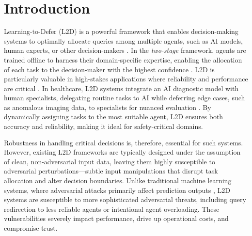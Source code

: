 
\section{Introduction}

Learning-to-Defer (L2D) is a powerful framework that enables decision-making systems to optimally allocate queries among multiple agents, such as AI models, human experts, or other decision-makers \citep{madras2018predict}. In the \emph{two-stage} framework, agents are trained offline to harness their domain-specific expertise, enabling the allocation of each task to the decision-maker with the highest confidence \citep{mao2023twostage, mao2024regressionmultiexpertdeferral, montreuil2024twostagelearningtodefermultitasklearning}. L2D is particularly valuable in high-stakes applications where reliability and performance are critical \citep{mozannar2021consistent, Verma2022LearningTD}. In healthcare, L2D systems integrate an AI diagnostic model with human specialists, delegating routine tasks to AI while deferring edge cases, such as anomalous imaging data, to specialists for nuanced evaluation \citep{Mozannar2023WhoSP}. By dynamically assigning tasks to the most suitable agent, L2D ensures both accuracy and reliability, making it ideal for safety-critical domains.


Robustness in handling critical decisions is, therefore, essential for such systems. However, existing L2D frameworks are typically designed under the assumption of clean, non-adversarial input data, leaving them highly susceptible to adversarial perturbations—subtle input manipulations that disrupt task allocation and alter decision boundaries. Unlike traditional machine learning systems, where adversarial attacks primarily affect prediction outputs \citep{goodfellow2014explaining, szegedy2014intriguingpropertiesneuralnetworks, Grounded}, L2D systems are susceptible to more sophisticated adversarial threats, including query redirection to less reliable agents or intentional agent overloading. These vulnerabilities severely impact performance, drive up operational costs, and compromise trust.


